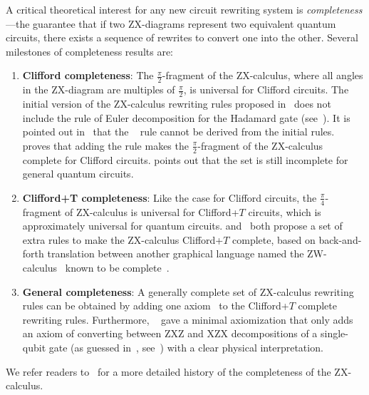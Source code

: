 \documentclass[a4paper,onecolumn,11pt,unpublished]{quantumarticle}
\begin{document}
A critical theoretical interest for any new circuit rewriting system is \textit{completeness}---the guarantee that if two ZX-diagrams represent two equivalent quantum circuits, there exists a sequence of rewrites to convert one into the other. Several milestones of completeness results are:
\begin{enumerate}
\item \textbf{Clifford completeness}: The $\frac{\pi}{2}$-fragment of the ZX-calculus, where all angles in the ZX-diagram are multiples of $\frac{\pi}{2}$, is universal for Clifford circuits.
The initial version of the ZX-calculus rewriting rules proposed in~\cite{coeckeInteractingQuantumObservables2008} does not include the rule of Euler decomposition for the Hadamard gate (see~). It is pointed out in~\cite{duncanGraphStatesNecessity2009} that the ~ rule cannot be derived from the initial rules. \cite{Backens_2014} proves that adding the rule makes the $\frac{\pi}{2}$-fragment of the ZX-calculus complete for Clifford circuits.
\cite{schroderdewittZXcalculusIncompleteQuantum2014} points out that the set is still incomplete for general quantum circuits.
\item \textbf{Clifford+T completeness}: Like the case for Clifford circuits, the $\frac{\pi}{4}$-fragment of ZX-calculus is universal for Clifford+$T$ circuits, which is approximately universal for quantum circuits. \cite{hadzihasanovicTwoCompleteAxiomatisations2018} and~\cite{jeandelCompletenessZXCalculus2020} both propose a set of extra rules to make the ZX-calculus Clifford+$T$ complete, based on back-and-forth translation between another graphical language named the ZW-calculus~\cite{coeckeCompositionalStructureMultipartite2010} known to be complete~\cite{hadzihasanovicDiagrammaticAxiomatisationQubit2015}.
\item \textbf{General completeness}: A generally complete set of ZX-calculus rewriting rules can be obtained by adding one axiom~\cite{jeandelCompletenessZXCalculus2020} to the Clifford+$T$ complete rewriting rules. Furthermore, ~\cite{vilmartNearMinimalAxiomatisationZXCalculus2019a} gave a minimal axiomization that only adds an axiom of converting between ZXZ and XZX decompositions of a single-qubit gate (as guessed in~\cite{schroderdewittZXcalculusIncompleteQuantum2014}, see~) with a clear physical interpretation.
\end{enumerate}
We refer readers to~\cite{weteringZXcalculusWorkingQuantum2020} for a more detailed history of the completeness of the ZX-calculus.
\end{document}
